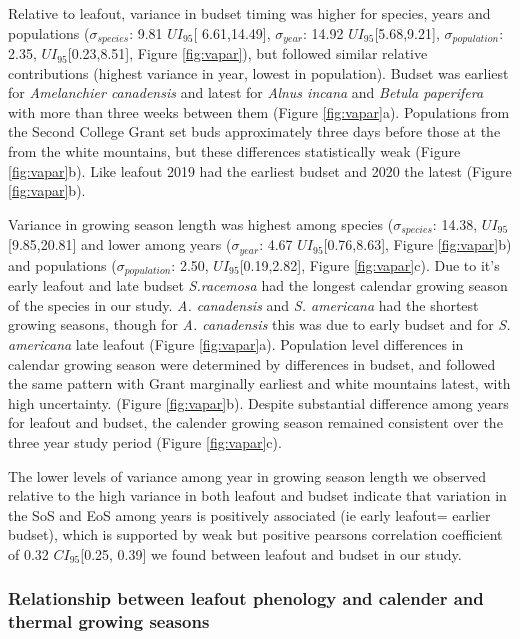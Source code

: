 \documentclass[12 pt]{article}
\begin{document}
Relative to leafout, variance in budset timing was higher for species, years and populations ($\sigma_{species}$: 9.81 $UI_{95}$[ 6.61,14.49], $\sigma_{year}$: 14.92 $UI_{95}$[5.68,9.21], $\sigma_{population}$: 2.35, $UI_{95}$[0.23,8.51], Figure \ref{fig:vapar}), but followed similar relative contributions (highest variance in year, lowest in population).
Budset was earliest for \emph{Amelanchier canadensis} and latest for \emph{Alnus incana} and \emph{Betula paperifera} with more than three weeks between them (Figure \ref{fig:vapar}a). Populations from the Second College Grant set buds approximately three days before those at the from the white mountains, but these differences statistically weak (Figure \ref{fig:vapar}b). Like leafout 2019 had the earliest budset and 2020 the latest (Figure \ref{fig:vapar}b).

Variance in growing season length was highest among species ($\sigma_{species}$: 14.38, $UI_{95}$[9.85,20.81] and lower among years ($\sigma_{year}$: 4.67 $UI_{95}$[0.76,8.63], Figure \ref{fig:vapar}b) and populations ($\sigma_{population}$: 2.50, $UI_{95}$[0.19,2.82], Figure \ref{fig:vapar}c). Due to it's early leafout and late budset \emph{S.racemosa} had the longest calendar growing season of the species in our study. \emph{A. canadensis} and \emph{S. americana} had the shortest growing seasons, though for \emph{A. canadensis} this was due to early budset and for \emph{S. americana} late leafout (Figure \ref{fig:vapar}a). Population level differences in calendar growing season were determined by differences in budset, and followed the same pattern with Grant marginally earliest and white mountains  latest, with high uncertainty. (Figure \ref{fig:vapar}b). Despite substantial difference among years for leafout and budset, the calender growing season remained consistent over the three year study period (Figure \ref{fig:vapar}c).

The lower levels of variance among year in growing season length we observed relative to the high variance in both leafout and budset indicate that variation in the SoS and EoS among years is positively associated (ie early leafout= earlier budset), which is supported by weak but positive pearsons correlation coefficient of 0.32 $CI_{95}$[0.25, 0.39] we found between leafout and budset in our study.

\subsubsection{Relationship between leafout phenology and calender and thermal growing seasons}
\end{document}

